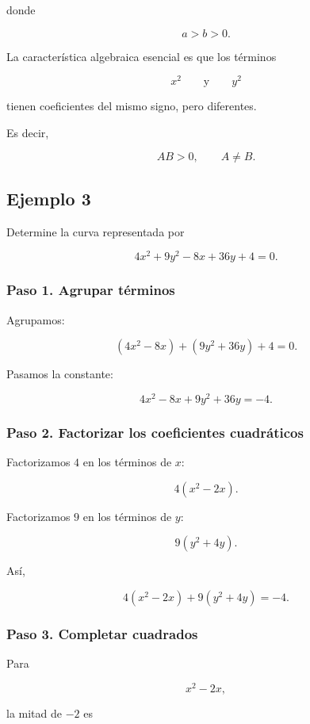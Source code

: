 \documentclass[12pt]{article}
\theoremstyle{plain}
\theoremstyle{definition}
\theoremstyle{remark}
\begin{document}
{donde

\[
a>b>0.
\]

La característica algebraica esencial es que los términos

\[
x^2
\qquad\text{y}\qquad
y^2
\]

tienen coeficientes del mismo signo, pero diferentes.

Es decir,

\[
\boxed{
AB>0,
\qquad
A\neq B.
}
\]

\subsection*{Ejemplo 3}

Determine la curva representada por

\[
4x^2+9y^2-8x+36y+4=0.
\]

\subsubsection*{Paso 1. Agrupar términos}

Agrupamos:

\[
(4x^2-8x)+(9y^2+36y)+4=0.
\]

Pasamos la constante:

\[
4x^2-8x+9y^2+36y=-4.
\]

\subsubsection*{Paso 2. Factorizar los coeficientes cuadráticos}

Factorizamos \(4\) en los términos de \(x\):

\[
4(x^2-2x).
\]

Factorizamos \(9\) en los términos de \(y\):

\[
9(y^2+4y).
\]

Así,

\[
4(x^2-2x)+9(y^2+4y)=-4.
\]

\subsubsection*{Paso 3. Completar cuadrados}

Para

\[
x^2-2x,
\]

la mitad de \(-2\) es

}
\end{document}
